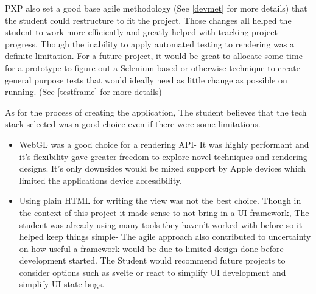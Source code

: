 PXP also set a good base agile methodology (See \ref{devmet} for more details) that the student could restructure to fit the project. Those changes all helped the student to work more efficiently and greatly helped with tracking project progress. Though the inability to apply automated testing to rendering was a definite limitation. For a future project, it would be great to allocate some time for a prototype to figure out a Selenium based or otherwise technique to create general purpose tests that would ideally need as little change as possible on running. (See \ref{testframe} for more details)

As for the process of creating the application, The student believes that the tech stack selected was a good choice even if there were some limitations.
\begin{itemize}
    \item WebGL was a good choice for a rendering API- It was highly performant and it's flexibility gave greater freedom to explore novel techniques and rendering designs. It's only downsides would be mixed support by Apple devices \cite[]{apple_metal} which limited the applications device accessibility.
    \item Using plain HTML for writing the view was not the best choice. Though in the context of this project it made sense to not bring in a UI framework, The student was already using many tools they haven't worked with before so it helped keep things simple- The agile approach also contributed to uncertainty on how useful a framework would be due to limited design done before development started. The Student would recommend future projects to consider options such as svelte or react to simplify UI development and simplify UI state bugs.
\end{itemize}

